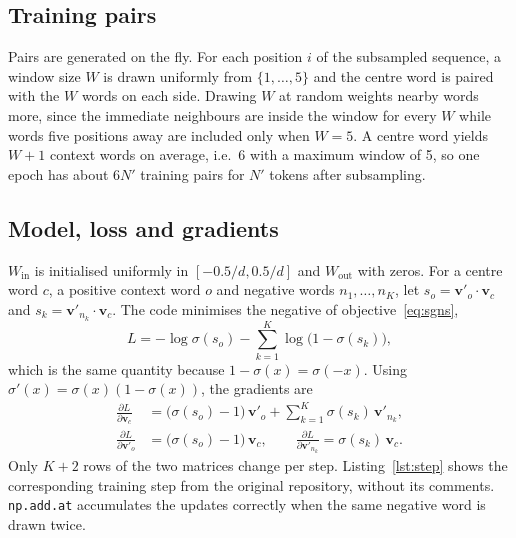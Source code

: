 \subsection{Training pairs}

Pairs are generated on the fly. For each position $i$ of the subsampled sequence, a window size $W$ is drawn uniformly from $\{1, \dots, 5\}$ and the centre word is paired with the $W$ words on each side. Drawing $W$ at random weights nearby words more, since the immediate neighbours are inside the window for every $W$ while words five positions away are included only when $W = 5$. A centre word yields $W + 1$ context words on average, i.e.\ 6 with a maximum window of 5, so one epoch has about $6N'$ training pairs for $N'$ tokens after subsampling.

\subsection{Model, loss and gradients}

$W_{\text{in}}$ is initialised uniformly in $[-0.5/d, 0.5/d]$ and $W_{\text{out}}$ with zeros. For a centre word $c$, a positive context word $o$ and negative words $n_1, \dots, n_K$, let $s_o = \mathbf{v}'_o \cdot \mathbf{v}_c$ and $s_k = \mathbf{v}'_{n_k} \cdot \mathbf{v}_c$. The code minimises the negative of objective~\eqref{eq:sgns},
\begin{equation}
    L = -\log \sigma(s_o) - \sum_{k=1}^{K} \log\bigl(1 - \sigma(s_k)\bigr),
\end{equation}
which is the same quantity because $1 - \sigma(x) = \sigma(-x)$. Using $\sigma'(x) = \sigma(x)(1 - \sigma(x))$, the gradients are
\begin{align}
    \frac{\partial L}{\partial \mathbf{v}_c} &= \bigl(\sigma(s_o) - 1\bigr)\, \mathbf{v}'_o + \sum_{k=1}^{K} \sigma(s_k)\, \mathbf{v}'_{n_k}, \\
    \frac{\partial L}{\partial \mathbf{v}'_o} &= \bigl(\sigma(s_o) - 1\bigr)\, \mathbf{v}_c,
    \qquad
    \frac{\partial L}{\partial \mathbf{v}'_{n_k}} = \sigma(s_k)\, \mathbf{v}_c .
\end{align}
Only $K + 2$ rows of the two matrices change per step. Listing~\ref{lst:step} shows the corresponding training step from the original repository, without its comments. \texttt{np.add.at} accumulates the updates correctly when the same negative word is drawn twice.

